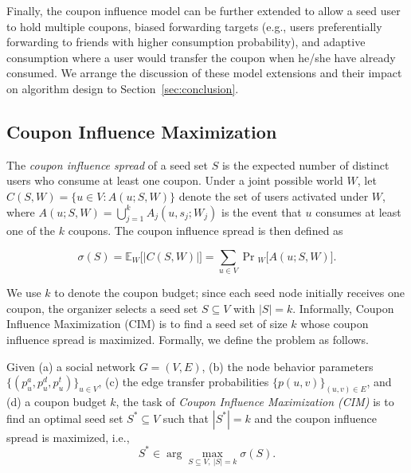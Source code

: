 \documentclass[sigconf]{acmart}
\begin{document}
Finally, the coupon influence model can be further extended to allow
a seed user to hold multiple coupons, biased forwarding targets
(e.g., users preferentially forwarding to friends with higher
consumption probability), and adaptive consumption where a user would transfer the coupon when he/she have already consumed.
We arrange the discussion of these model extensions and their impact
on algorithm design to Section~\ref{sec:conclusion}.

\subsection{Coupon Influence Maximization}

The \emph{coupon influence spread} of a seed set $S$ is the expected
number of distinct users who consume at least one coupon.
Under a joint possible world $W$, let $C(S,W)=\{u\in V : A(u;S,W)\}$
denote the set of users activated under $W$, where
$A(u;S,W)=\bigcup_{j=1}^{k} A_j(u,s_j;W_j)$ is the event that $u$
consumes at least one of the $k$ coupons.
The coupon influence spread is then defined as

\begin{equation}
\label{eq:coupon-spread}
\sigma(S)
=
\mathbb{E}_{W}\bigl[|C(S,W)|\bigr]
=
\sum_{u\in V}
\Pr{}_{W}\bigl[A(u;S,W)\bigr].
\end{equation}

We use $k$ to denote the coupon budget; since each seed node
initially receives one coupon, the organizer selects a seed set
$S\subseteq V$ with $|S|=k$.
Informally, Coupon Influence Maximization (CIM) is to find a seed set
of size $k$ whose coupon influence spread is maximized.
Formally, we define the problem as follows.

\begin{definition}
\label{def:cim}
Given (a) a social network $G=(V,E)$,
(b) the node behavior parameters
$\{(p_u^a,p_u^d,p_u^t)\}_{u\in V}$,
(c) the edge transfer probabilities
$\{p(u,v)\}_{(u,v)\in E}$,
and (d) a coupon budget $k$,
the task of \emph{Coupon Influence Maximization (CIM)} is to find an
optimal seed set $S^*\subseteq V$ such that $|S^*|=k$ and the coupon
influence spread is maximized, i.e.,
\begin{equation}
\label{eq:cim}
S^*
\in
\arg\max_{S\subseteq V,\ |S|=k}
\sigma(S).
\end{equation}
\end{definition}
\end{document}
